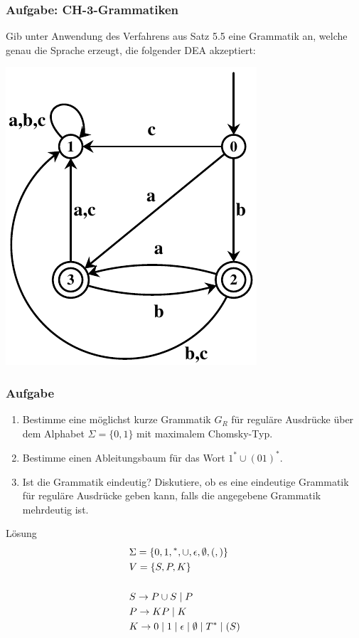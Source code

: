 \begin{frame}
\frametitle{Aufgabe: CH-3-Grammatiken}
Gib unter Anwendung des Verfahrens aus Satz 5.5 eine Grammatik an,
welche genau die Sprache erzeugt, die folgender DEA akzeptiert:

\begin{center}\includegraphics[scale=0.8]{./images/dea1.pdf}\end{center}
\end{frame}


\begin{frame}
\frametitle{Aufgabe}
\begin{enumerate}
\item Bestimme eine möglichst kurze Grammatik $G_R$ für reguläre Ausdrücke über dem Alphabet $\Sigma = \{0,1\}$ mit maximalem Chomsky-Typ.
\item Bestimme einen Ableitungsbaum für das Wort $1^* \cup (01)^*$. 
\item Ist die Grammatik eindeutig? Diskutiere, ob es eine eindeutige Grammatik für reguläre Ausdrücke geben kann, falls die angegebene Grammatik mehrdeutig ist.
\end{enumerate}

\invincible
\pause
\begin{block}{Lösung}
\ducttape{-1cm}
\begin{align*}
&\Sigma = \{ 0, 1, \vphantom{0}^\ast, \cup, \epsilon, \emptyset, (, ) \} \\
&V = \{ S, P, K \} \\
\\
&S \rightarrow P \cup S \mid P \\
&P \rightarrow KP \mid K \\
&K \rightarrow 0 \mid 1 \mid \epsilon \mid \emptyset \mid T^\ast \mid (S)
\end{align*}
\end{block}
\vincible
\end{frame}

